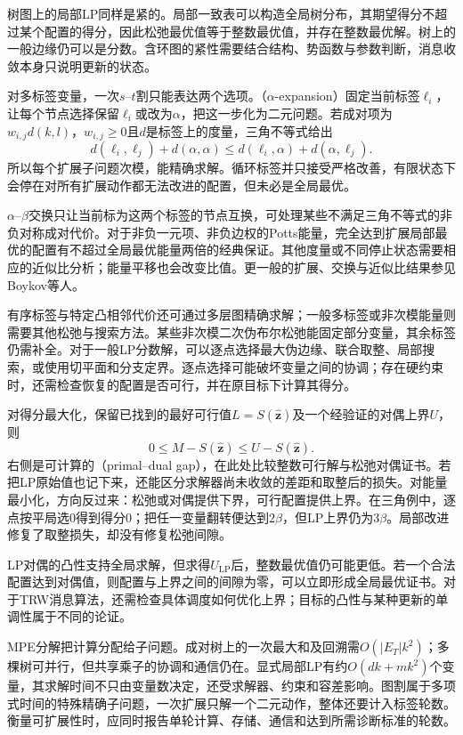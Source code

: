 树图上的局部LP同样是紧的。局部一致表可以构造全局树分布，其期望得分不超过某个配置的得分，因此松弛最优值等于整数最优值，并存在整数最优解。树上的一般边缘仍可以是分数。含环图的紧性需要结合结构、势函数与参数判断，消息收敛本身只说明更新的状态。

对多标签变量，一次$s$--$t$割只能表达两个选项。（$\alpha$-expansion）固定当前标签$\ell_i$，让每个节点选择保留$\ell_i$或改为$\alpha$，把这一步化为二元问题。若成对项为$w_{i,j}d(k,l)$，$w_{i,j}\geq0$且$d$是标签上的度量，三角不等式给出
\[
  d(\ell_i,\ell_j)+d(\alpha,\alpha)
    \leq d(\ell_i,\alpha)+d(\alpha,\ell_j).
\]
所以每个扩展子问题次模，能精确求解。循环标签并只接受严格改善，有限状态下会停在对所有扩展动作都无法改进的配置，但未必是全局最优。

$\alpha$--$\beta$交换只让当前标为这两个标签的节点互换，可处理某些不满足三角不等式的非负对称成对代价。对于非负一元项、非负边权的Potts能量，完全达到扩展局部最优的配置有不超过全局最优能量两倍的经典保证。其他度量或不同停止状态需要相应的近似比分析；能量平移也会改变比值。更一般的扩展、交换与近似比结果参见Boykov等人。

有序标签与特定凸相邻代价还可通过多层图精确求解；一般多标签或非次模能量则需要其他松弛与搜索方法。某些非次模二次伪布尔松弛能固定部分变量，其余标签仍需补全。对于一般LP分数解，可以逐点选择最大伪边缘、联合取整、局部搜索，或使用切平面和分支定界。逐点选择可能破坏变量之间的协调；存在硬约束时，还需检查恢复的配置是否可行，并在原目标下计算其得分。

对得分最大化，保留已找到的最好可行值$L=S(\widehat{\bm z})$及一个经验证的对偶上界$U$，则
\begin{equation}
  0\leq M-S(\widehat{\bm z})\leq U-S(\widehat{\bm z}).
  \label{eq:pgm-variational-gap}
\end{equation}
右侧是可计算的（primal--dual gap），在此处比较整数可行解与松弛对偶证书。若把LP原始值也记下来，还能区分求解器尚未收敛的差距和取整后的损失。对能量最小化，方向反过来：松弛或对偶提供下界，可行配置提供上界。在三角例中，逐点按平局选$0$得到得分$0$；把任一变量翻转便达到$2\beta$，但LP上界仍为$3\beta$。局部改进修复了取整损失，却没有修复松弛间隙。

LP对偶的凸性支持全局求解，但求得$U_{\mathrm{LP}}$后，整数最优值仍可能更低。若一个合法配置达到对偶值，则配置与上界之间的间隙为零，可以立即形成全局最优证书。对于TRW消息算法，还需检查具体调度如何优化上界；目标的凸性与某种更新的单调性属于不同的论证。

MPE分解把计算分配给子问题。成对树上的一次最大和及回溯需$O(|E_T|k^2)$；多棵树可并行，但共享乘子的协调和通信仍在。显式局部LP有约$O(dk+mk^2)$个变量，其求解时间不只由变量数决定，还受求解器、约束和容差影响。图割属于多项式时间的特殊精确子问题，一次扩展只解一个二元动作，整体还要计入标签轮数。衡量可扩展性时，应同时报告单轮计算、存储、通信和达到所需诊断标准的轮数。

